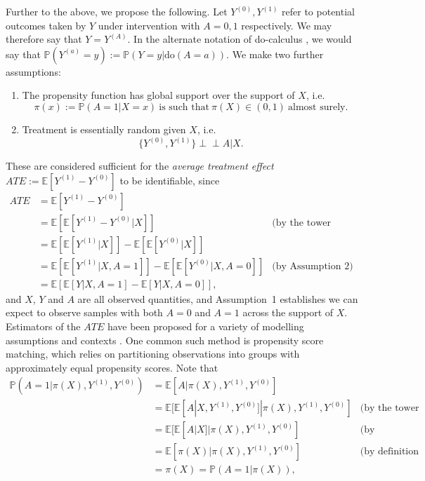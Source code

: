 \documentclass[../thesis.tex]{subfiles}
\begin{document}
Further to the above, we propose the following. Let $Y^{(0)}, Y^{(1)}$ refer to potential outcomes taken by $Y$ under intervention with $A=0,1$
respectively. We may therefore say that $Y=Y^{(A)}$. In the alternate notation of do-calculus \citep{pearl_causal_1995, pearl_-calculus_2012}, we would say that $\mathbb{P}(Y^{(a)} = y) := \mathbb{P}(Y = y |  \text{do}(A=a))$. We make two further assumptions: 
\begin{enumerate}
    \item The propensity function has global support over the support of $X$, i.e. 
    \[\pi(x) := \mathbb{P}(A=1 | X = x) \  \text{is such that} \ \pi(X) \in (0,1) \ \text{almost surely.}\]
    \item Treatment is essentially random given $X$, i.e.
    \[\{Y^{(0)}, Y^{(1)}\} \perp\!\!\!\perp A | X. \]
\end{enumerate}
These are considered sufficient for the \emph{average treatment effect} $ATE := \mathbb{E}[Y^{(1)} -Y^{(0)}]$ to be identifiable, since 
\begin{align*}
    ATE & = \mathbb{E}[Y^{(1)} - Y^{(0)} ] & \\
    & = \mathbb{E}[\mathbb{E}[Y^{(1)} - Y^{(0)} | X]] & \text{(by the tower property)} \\
    & = \mathbb{E}[\mathbb{E}[Y^{(1)} | X]] - \mathbb{E}[\mathbb{E}[Y^{(0)} | X]] & \\ 
    & = \mathbb{E}[\mathbb{E}[Y^{(1)} | X, A = 1]] - \mathbb{E}[\mathbb{E}[Y^{(0)} | X, A = 0]] & \text{(by Assumption~2)} \\
    & = \mathbb{E}[\mathbb{E}[Y | X, A = 1] - \mathbb{E}[Y | X, A = 0]], & \label{eq:ate}
\end{align*}
and $X$, $Y$ and $A$ are all observed quantities, and Assumption~1 establishes we can expect to observe samples with both $A=0$ and $A=1$ across the support of $X$. Estimators of the $ATE$ have been proposed for a variety of modelling assumptions and contexts \citep{reiersol_confluence_1945, thistlethwaite_regression-discontinuity_1960, rosenbaum_central_1983, abadie_semiparametric_2005, craig_natural_2017, roth_whats_2023}. One common such method is propensity score matching, which relies on partitioning observations into groups with approximately equal propensity scores. Note that 
\begin{align*}
    \mathbb{P}(A=1 | \pi(X), Y^{(1)}, Y^{(0)}) & = \mathbb{E}[A | \pi(X), Y^{(1)}, Y^{(0)}] & \\
    & = \mathbb{E}[\mathbb{E}[A | X, Y^{(1)}, Y^{(0)}] | \pi(X), Y^{(1)}, Y^{(0)}] & \text{(by the tower property)}\\
    & = \mathbb{E}[\mathbb{E}[A|X]|\pi(X), Y^{(1)}, Y^{(0)}] & \text{(by Assumption~2)} \\
    & = \mathbb{E}[\pi(X) | \pi(X), Y^{(1)}, Y^{(0)}] & \text{(by definition of propensity)} \\
    & = \pi(X) = \mathbb{P}(A=1|\pi(X)), &
\end{align*}
\end{document}
